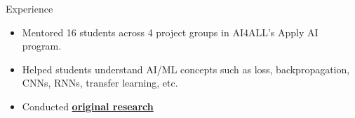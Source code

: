 \documentclass{resume} %
\begin{document}
\begin{workSection}{Experience}
    \experienceItem[
        company=AI4ALL,
        location=Remote,
        position=Student Coordinator,
        duration=August 2023 {-} December 2023
    ]
    \begin{itemize}
        \vspace{-0.5em}
        \itemsep -6pt {}
        \item Mentored 16 students across 4 project groups in AI4ALL's Apply AI program.
        \item Helped students understand AI/ML concepts such as loss, backpropagation, CNNs, RNNs, transfer learning, etc.
    \end{itemize}
    \experienceItem[
    company=Temple University,
    location=Philadelphia{,} PA,
    position=Undergraduate Researcher,
    duration=June {-} July 2023
    ]
    \begin{itemize}
        \vspace{-0.5em}
        \itemsep -6pt {}
        \item Conducted \href{https://dl.acm.org/doi/10.1145/3565287.3617613}{\textbf{original research} \faExternalLink} 

\end{itemize}
\end{workSection}
\end{document}
